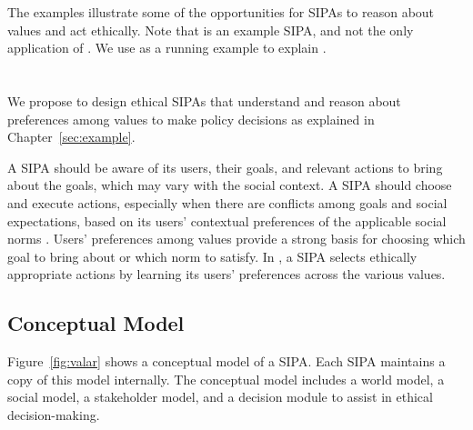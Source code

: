 
The \locationapp examples illustrate some of the opportunities for SIPAs to reason about values and act ethically. 
Note that \locationapp is an example SIPA, and not the only application of \frameworkAinur. 
We use \locationapp as a running example to explain \frameworkAinur.

\section{\frameworkAinur}
\label{sec:method}

We propose \frameworkAinur to design ethical SIPAs that understand and reason about preferences among values to make policy decisions as explained in Chapter~\ref{sec:example}.

A SIPA should be aware of its users, their goals, and relevant
actions to bring about the goals, which may vary with the social
context. A SIPA should choose and execute actions, especially when
there are conflicts among goals and social expectations, based on
its users' contextual preferences of the applicable social norms
\citep{Ajmeri-AAMAS17-Arnor}. Users' preferences among values
provide a strong basis for choosing which goal to bring about or which
norm to satisfy. In \frameworkAinur, a SIPA selects ethically appropriate
actions by learning its users' preferences across the various
values.

\subsection{Conceptual Model}

Figure~\ref{fig:valar} shows a conceptual model of a \frameworkAinur SIPA. 
Each SIPA maintains a copy of this model internally. 
The conceptual model includes a world model, a social model, 
a stakeholder model, and a decision module to assist in 
ethical decision-making. 

